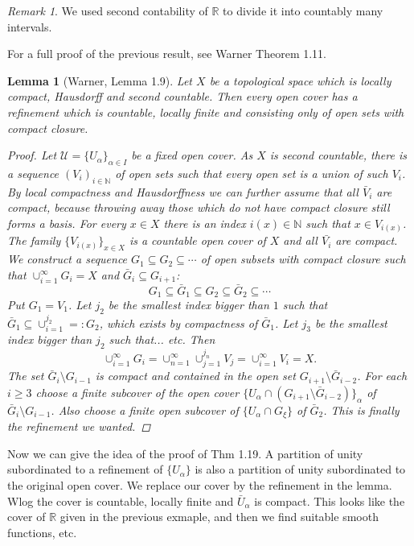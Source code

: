 \documentclass[12pt]{article}
\theoremstyle{darkgreentheorem}
\newtheorem{lm}[thm]{Lemma}
\theoremstyle{darkbluedefinition}
\theoremstyle{darkredexample}
\theoremstyle{remark}
\newtheorem{rem}[thm]{Remark}
\newcommand{\N}{\mathbb{N}}
\newcommand{\R}{\mathbb{R}}
\newcommand{\1}{\mathbbm{1}}
\newcommand{\U}{\mathcal{U}}
\newcommand{\sub}{\subseteq}
\begin{document}
\begin{rem}
    We used second contability of $\R$ to divide it into countably many intervals.
\end{rem}

For a full proof of the previous result, see Warner Theorem 1.11.

\begin{lm}[Warner, Lemma 1.9]
    Let $X$ be a topological space which is locally compact, Hausdorff and second countable.
    Then every open cover has a refinement which is countable, locally finite and consisting only of open sets with compact closure.
    \begin{proof}
	Let $\U=\{U_{\alpha}\}_{\alpha\in I}$ be a fixed open cover.
	As $X$ is second countable, there is a sequence $(V_{i})_{i\in \N}$ of open sets such that every open set is a union of such $V_{i}$.
	By local compactness and Hausdorffness we can further assume that all $\bar{V}_{i}$ are compact, because throwing away those which do not have compact closure still forms a basis.
	For every $x\in X$ there is an index $i(x)\in \N$ such that $x\in V_{i(x)}$.
	The family $\{V_{i(x)}\}_{x\in X}$ is a countable open cover of $X$ and all $\bar{V_{i}}$ are compact.
	We construct a sequence $G_{1}\sub G_{2}\sub \cdots $ of open subsets with compact closure such that $\cup_{i=1}^{\infty}G_{i}=X$ and $\bar{G}_{i}\sub G_{i+1}$:
	\[ G_{1}\sub \bar{G}_{1}\sub G_{2}\sub \bar{G}_{2}\sub \cdots \]
	Put $G_{1}=V_{1}$.
	Let $j_{2}$ be the smallest index bigger than $1$ such that $\bar{G}_{1}\sub \cup_{i=1}^{j_{2}}=:G_{2}$, which exists by compactness of $\bar{G}_{1}$.
	Let $j_{3}$ be the smallest index bigger than $j_{2}$ such that... etc.
	Then
	\[ \cup_{i=1}^{\infty}G_{i}=\cup_{n=1}^{\infty}\cup_{j=1}^{j_{n}}V_{j}=\cup_{i=1}^{\infty}V_{i}=X.\]
	The set $\bar{G}_{i}\setminus G_{i-1}$ is compact and contained in the open set $G_{i+1}\setminus \bar{G}_{i-2}$.
	For each $i\geqslant 3$ choose a finite subcover of the open cover $\{U_{\alpha}\cap (G_{i+1}\setminus \bar{G}_{i-2})\}_{\alpha}$ of $\bar{G}_{i}\setminus G_{i-1}$.
	Also choose a finite open subcover of $\{U_{\alpha} \cap G_{\xi}\}$ of $\bar{G}_{2}$.
	This is finally the refinement we wanted.
    \end{proof}
\end{lm}

Now we can give the idea of the proof of Thm 1.19.
A partition of unity subordinated to a refinement of $\{U_{\alpha}\}$ is also a partition of unity subordinated to the original open cover.
We replace our cover by the refinement in the lemma.
Wlog the cover is countable, locally finite and $\bar{U}_{\alpha}$ is compact.
This looks like the cover of $\R$ given in the previous exmaple, and then we find suitable smooth functions, etc.
\end{document}
